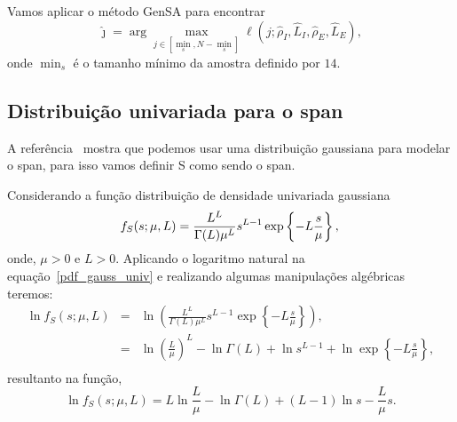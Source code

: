 Vamos aplicar o método GenSA para encontrar
$$
\widehat{\jmath}= \arg\max\limits_{j\in [\min_s,N-\min_s]}\ell(j;\widehat{\rho}_I, \widehat{L}_I,\widehat{\rho}_E, \widehat{L}_E),
$$ 
onde $\min_s$ é o tamanho mínimo da amostra definido por $14$.

\subsection{Distribuição univariada para o span}

A referência~\cite{fwzjn} mostra que podemos usar uma distribuição gaussiana para modelar o span, para isso vamos definir S como sendo o span.   

Considerando a função distribuição de densidade univariada gaussiana 
\begin{equation}\label{pdf_gauss_univ}
	f_{S}(s;\mu,L)=\frac{L^{L}}{\Gamma(L)\mu^{L}} s^{L-1}\exp\left\{-L\frac{s}{\mu}\right\}, \\
\end{equation}
onde, $\mu>0$ e $L>0$. Aplicando o logaritmo natural na equação~\eqref{pdf_gauss_univ}  e realizando algumas manipulações algébricas teremos:
\begin{equation}\nonumber
\begin{array}{ccl}
	\ln f_{S}(s;\mu,L)&=&\ln \left(\frac{L^{L}}{\Gamma(L)\mu^{L}} s^{L-1}\exp\left\{-L\frac{s}{\mu}\right\}\right), \\
	                                         &=&\ln\left(\frac{L}{\mu}\right)^L-\ln\Gamma(L)+ \ln s^{L-1} + \ln \exp\left\{-L\frac{s}{\mu}\right\}, \\
\end{array}
\end{equation}
resultanto na função,
\begin{equation}\label{func_log_univ_gaussiana}
	\ln f_{S}(s;\mu,L)=L\ln\frac{L}{\mu}-\ln\Gamma(L)+(L-1)\ln s - \frac{L}{\mu} s.
\end{equation}

